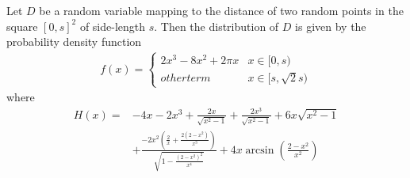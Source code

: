 \begin{theorem} \label{lemma:distance_unit_square}
  Let $D$ be a random variable mapping to the distance of
  two random points in the square $[0,s]^2$ of side-length $s$. Then the
  distribution of $D$ is given by the probability density function
  \begin{align*}
    f(x) = \begin{cases} 2x^3 -8x^2 + 2\pi x & x \in [0,s) \\ %
                         other term         &  x \in [s,\sqrt{2}s) %
           \end{cases}%
  \end{align*}
  where
  \begin{align*}
    H(x) = & - 4x -2x^3 + \frac{2x}{\sqrt{x^2-1}} + \frac{2 x^3}{\sqrt{x^2-1}} + 
 6x \sqrt{x^2-1} \\
           & + \frac{-2 x^2 \left(\frac{2}{x} + \frac{2 (2 - x^2)}{x^3}\right)}{\sqrt{
 1 - \frac{(2 - x^2)^2}{x^4}}} + 4 x \operatorname{arcsin}\left(\frac{2 -
x^2}{x^2}\right)
  \end{align*}
\end{theorem}
%

